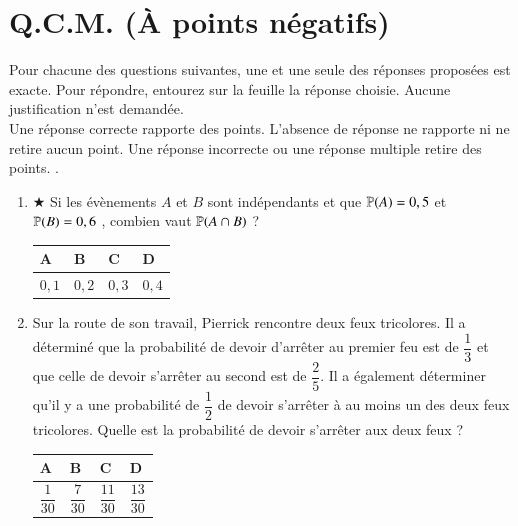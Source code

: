 \documentclass[oneside,12pt]{exam}          %
\begin{document}
\section{Q.C.M. (À points négatifs)}
Pour chacune des questions suivantes, une et une seule des réponses proposées est exacte. Pour répondre, entourez sur la feuille la réponse choisie. Aucune justification n'est demandée. \\
Une réponse correcte rapporte des points. L'absence de réponse ne rapporte ni ne retire aucun point.
Une réponse incorrecte ou une réponse multiple retire des points. . 

\begin{enumerate}[label=\underline{Question \no\arabic*} :  , leftmargin=* , itemsep=1mm]
	\item $\bigstar$ Si les évènements $A$ et $B$ sont indépendants et que ${\mathbb P}(A) = 0,5$  et ${\mathbb P}(B) = 0,6$ , combien vaut  ${\mathbb P}(A \cap B)$ ?
	
		\hspace{\linewidth-\textwidth}
		\renewcommand{\arraystretch}{1.5}
		\begin{tabular}{| P{0.22\textwidth} | P{0.22\textwidth} | P{0.22\textwidth} | P{0.22\textwidth} |} \hline
			A & B & C & D \\ \hline
			$0,1$ & $0,2$ & $0,3$  & $0,4$ \\ \hline
		\end{tabular}
		
	\item Sur la route de son travail, Pierrick rencontre deux feux tricolores. Il a déterminé que la probabilité de devoir d'arrêter au premier feu est de $\dfrac{1}{3}$ et que celle de devoir s'arrêter au second est de $\dfrac{2}{5}$. Il a également déterminer qu'il y a une probabilité de $\dfrac{1}{2}$ de devoir s'arrêter à au moins un des deux feux tricolores. Quelle est la probabilité de devoir s'arrêter aux deux feux ?
	
		\hspace{\linewidth-\textwidth}
		\renewcommand{\arraystretch}{2}
		\begin{tabular}{| P{0.22\textwidth} | P{0.22\textwidth} | P{0.22\textwidth} | P{0.22\textwidth} |} \hline
			A & B & C & D \\ \hline
			$\dfrac{1}{30}$ & $\dfrac{7}{30}$ & $\dfrac{11}{30}$ & $\dfrac{13}{30}$ \\ \hline
		\end{tabular}
		
\end{enumerate}
\end{document}
